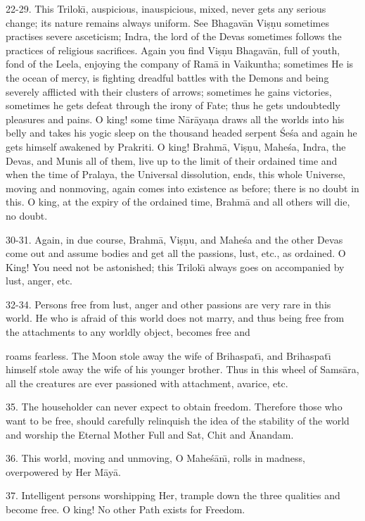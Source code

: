 22-29. This Trilok\={\i}, auspicious, inauspicious, mixed, never gets any serious change; its nature remains always uniform. See Bhagav\=an Vi\d{s}\d{n}u sometimes practises severe asceticism; Indra, the lord of the Devas sometimes follows the practices of religious sacrifices. Again you find Vi\d{s}\d{n}u Bhagav\=an, full of youth, fond of the Leela, enjoying the company of Ram\=a in Vaikuntha; sometimes He is the ocean of mercy, is fighting dreadful battles with the Demons and being severely afflicted with their clusters of arrows; sometimes he gains victories, sometimes he gets defeat through the irony of Fate; thus he gets undoubtedly pleasures and pains. O king! some time N\=ar\=aya\d{n}a draws all the worlds into his belly and takes his yogic sleep on the thousand headed serpent \'Se\'sa and again he gets himself awakened by Prakriti. O king! Brahm\=a, Vi\d{s}\d{n}u, Mahe\'sa, Indra, the Devas, and Munis all of them, live up to the limit of their ordained time and when the time of Pralaya, the Universal dissolution, ends, this whole Universe, moving and nonmoving, again comes into existence as before; there is no doubt in this. O king, at the expiry of the ordained time, Brahm\=a and all others will die, no doubt.

30-31. Again, in due course, Brahm\=a, Vi\d{s}\d{n}u, and Mahe\'sa and the other Devas come out and assume bodies and get all the passions, lust, etc., as ordained. O King! You need not be astonished; this Trilok\={\i} always goes on accompanied by lust, anger, etc.

32-34. Persons free from lust, anger and other passions are very rare in this world. He who is afraid of this world does not marry, and thus being free from the attachments to any worldly object, becomes free and

roams fearless. The Moon stole away the wife of Brihaspat\={\i}, and Brihaspat\={\i} himself stole away the wife of his younger brother. Thus in this wheel of Sams\=ara, all the creatures are ever passioned with attachment, avarice, etc.

35. The householder can never expect to obtain freedom. Therefore those who want to be free, should carefully relinquish the idea of the stability of the world and worship the Eternal Mother Full and Sat, Chit and \=Anandam.

36. This world, moving and unmoving, O Mahe\'s\=an\={\i}, rolls in madness, overpowered by Her M\=ay\=a.

37. Intelligent persons worshipping Her, trample down the three qualities and become free. O king! No other Path exists for Freedom.

